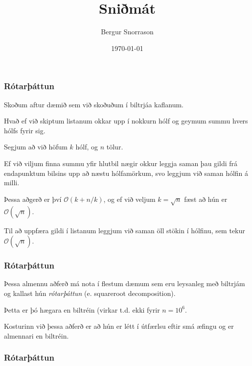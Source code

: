 \title{Sniðmát}
\author{Bergur Snorrason}
\date{\today}



\frame{\titlepage}

{
	\frametitle{Rótarþáttun}
	{
		\item<1-> Skoðum aftur dæmið sem við skoðuðum í biltrjáa kaflanum.
		\item<2-> Hvað ef við skiptum listanum okkar upp í nokkurn hólf og geymum summu hvers hólfs fyrir sig.
		\item<3-> Segjum að við höfum $k$ hólf, og $n$ tölur.
		\item<4-> Ef við viljum finna summu yfir hlutbil nægir okkur leggja saman þau gildi frá endapunktum bilsins upp að næstu hólfamörkum,
			svo leggjum við saman hólfin á milli.
		\item<5-> Þessa aðgerð er því $\mathcal{O}(k + n/k)$, og ef við veljum $k = \sqrt{n}$ fæst að hún er $\mathcal{O}(\sqrt{n})$.
		\item<6-> Til að uppfæra gildi í listanum leggjum við saman öll stökin í hólfinu, sem tekur $\mathcal{O}(\sqrt{n})$.
	}
}

{
	\frametitle{Rótarþáttun}
	{
		\item<1-> Þessa almennu aðferð má nota í flestum dæmum sem eru leysanleg með biltrjám og kallast hún \emph{rótarþáttun} (e. squareroot decomposition).
		\item<2-> Þetta er þó hægara en biltréin (virkar t.d. ekki fyrir $n = 10^6$.
		\item<3-> Kosturinn við þessa aðferð er að hún er létt í útfærlsu eftir smá æfingu og er almennari en biltréin.
	}
}

{
	\frametitle{Rótarþáttun}
}


